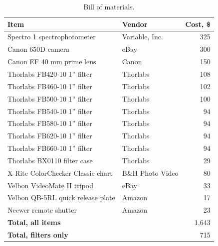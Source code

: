 \documentclass[twocolumn,10pt]{asme2ej}
\begin{document}
\begin{table}[t]
\begin{center}
\begin{tabular}{l l r}
\textbf{Item} & \textbf{Vendor} & \textbf{Cost, \$} \\
\hline
Spectro 1 spectrophotometer       & Variable, Inc. &   325 \\
Canon 650D camera                 & eBay &             300 \\
Canon EF 40 mm prime lens         & Canon &            150 \\
Thorlabs FB420-10 1'' filter      & Thorlabs &         108 \\
Thorlabs FB460-10 1'' filter      & Thorlabs &         102 \\
Thorlabs FB500-10 1'' filter      & Thorlabs &         100 \\
Thorlabs FB540-10 1'' filter      & Thorlabs &         94  \\
Thorlabs FB580-10 1'' filter      & Thorlabs &         94  \\
Thorlabs FB620-10 1'' filter      & Thorlabs &         94  \\
Thorlabs FB660-10 1'' filter      & Thorlabs &         94  \\
Thorlabs BX0110 filter case  & Thorlabs &         29  \\
X-Rite ColorChecker Classic chart         & B\&H Photo Video & 80  \\
Velbon VideoMate II tripod        & eBay &             33  \\
Velbon QB-5RL quick release plate & Amazon &           17  \\
Neewer remote shutter             & Amazon &           23  \\
\hline
\textbf{Total, all items} & & 1,643 \\
\textbf{Total, filters only} & & 715 \\
\end{tabular}
\caption{Bill of materials.}
\label{materials}
\end{center}
\end{table}
\end{document}
